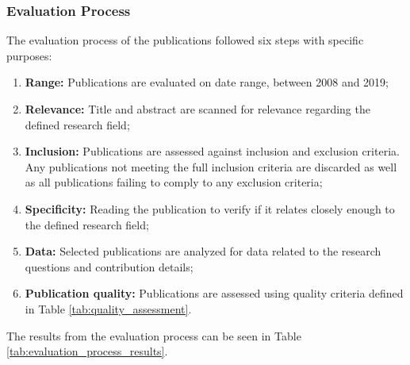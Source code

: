 \subsubsection{Evaluation Process}\label{sec:evaluation_process}

The evaluation process of the publications followed six steps with specific purposes:

\begin{enumerate}
    \item \textbf{Range:} Publications are evaluated on date range, between 2008 and 2019;
    \item \textbf{Relevance:} Title and abstract are scanned for relevance regarding the defined research field;
    \item \textbf{Inclusion:} Publications are assessed against inclusion and exclusion criteria. Any publications not meeting the full inclusion criteria are discarded as well as all publications failing to comply to any exclusion criteria;
    \item \textbf{Specificity:} Reading the publication to verify if it relates closely enough to the defined research field; 
    \item \textbf{Data:} Selected publications are analyzed for data related to the research questions and contribution details;
    \item \textbf{Publication quality:} Publications are assessed using quality criteria defined in Table \ref{tab:quality_assessment}.
\end{enumerate}{}

The results from the evaluation process can be seen in Table \ref{tab:evaluation_process_results}.

\captionsetup{belowskip=12pt,aboveskip=4pt}
\begin{table}[ht]
    \centering
    \caption{Publications per step}
    \label{tab:evaluation_process_results}
\end{table}{}

